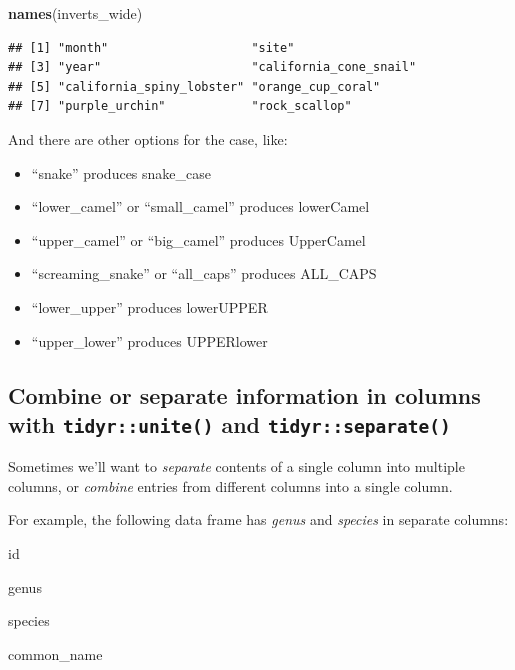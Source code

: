 \documentclass[]{book}
\newenvironment{Shaded}{\begin{snugshade}}{\end{snugshade}}
\newcommand{\KeywordTok}[1]{\textcolor[rgb]{0.13,0.29,0.53}{\textbf{#1}}}
\newcommand{\NormalTok}[1]{#1}
\providecommand{\tightlist}{%
  \setlength{\itemsep}{0pt}\setlength{\parskip}{0pt}}
\begin{document}
\begin{Shaded}
\begin{Highlighting}[]
\KeywordTok{names}\NormalTok{(inverts_wide)}
\end{Highlighting}
\end{Shaded}

\begin{verbatim}
## [1] "month"                    "site"                    
## [3] "year"                     "california_cone_snail"   
## [5] "california_spiny_lobster" "orange_cup_coral"        
## [7] "purple_urchin"            "rock_scallop"
\end{verbatim}

And there are other options for the case, like:

\begin{itemize}
\tightlist
\item
  ``snake'' produces snake\_case
\item
  ``lower\_camel'' or ``small\_camel'' produces lowerCamel
\item
  ``upper\_camel'' or ``big\_camel'' produces UpperCamel
\item
  ``screaming\_snake'' or ``all\_caps'' produces ALL\_CAPS
\item
  ``lower\_upper'' produces lowerUPPER
\item
  ``upper\_lower'' produces UPPERlower
\end{itemize}

\hypertarget{combine-or-separate-information-in-columns-with-tidyrunite-and-tidyrseparate}{%
\subsection{\texorpdfstring{Combine or separate information in columns with \texttt{tidyr::unite()} and \texttt{tidyr::separate()}}{Combine or separate information in columns with tidyr::unite() and tidyr::separate()}}\label{combine-or-separate-information-in-columns-with-tidyrunite-and-tidyrseparate}}

Sometimes we'll want to \emph{separate} contents of a single column into multiple columns, or \emph{combine} entries from different columns into a single column.

For example, the following data frame has \emph{genus} and \emph{species} in separate columns:

id

genus

species

common\_name
\end{document}
